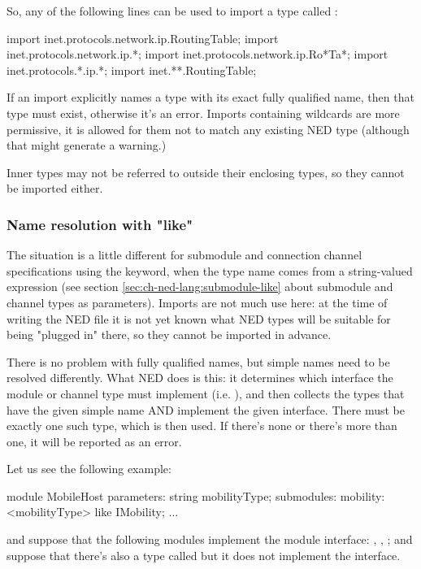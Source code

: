 So, any of the following lines can be used to import a type called
:

\begin{ned}
import inet.protocols.network.ip.RoutingTable;
import inet.protocols.network.ip.*;
import inet.protocols.network.ip.Ro*Ta*;
import inet.protocols.*.ip.*;
import inet.**.RoutingTable;
\end{ned}

If an import explicitly names a type with its exact fully qualified name,
then that type must exist, otherwise it's an error. Imports containing
wildcards are more permissive, it is allowed for them not to match any
existing NED type (although that might generate a warning.)

Inner types may not be referred to outside their enclosing types, so they
cannot be imported either.


\subsubsection{Name resolution with "like"}

The situation is a little different for submodule and connection channel
specifications using the  keyword, when the type name comes
from a string-valued expression (see section
\ref{sec:ch-ned-lang:submodule-like} about submodule and channel types as
parameters). Imports are not much use here: at the time of writing the NED
file it is not yet known what NED types will be suitable for being "plugged
in" there, so they cannot be imported in advance.

There is no problem with fully qualified names, but simple names need
to be resolved differently. What NED does is this: it determines which
interface the module or channel type must implement (i.e. ),
and then collects the types that have the given simple name AND implement
the given interface. There must be exactly one such type, which is then used.
If there's none or there's more than one, it will be reported as an error.

Let us see the following example:

\begin{ned}
module MobileHost
{
    parameters:
        string mobilityType;
    submodules:
        mobility: <mobilityType> like IMobility;
        ...
}
\end{ned}

and suppose that the following modules implement the  module
interface: , ,
; and suppose that there's also a type
called  but it does not implement the
interface.

